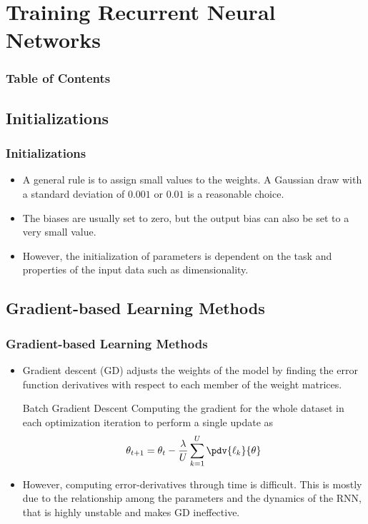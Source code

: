 \documentclass[11pt,]{beamer}
\begin{document}
\section{Training Recurrent Neural Networks}
\begin{frame}
	\frametitle{Table of Contents}
	\tableofcontents[currentsection]
\end{frame}

\subsection{Initializations}

\begin{frame}
	\frametitle{Initializations}

	\begin{itemize}
		\item A general rule is to assign small values to the weights. A
		Gaussian draw with a standard deviation of $0.001$ or $0.01$ is a reasonable choice.
		\bigskip
		\item The biases are usually set to zero,
		but the output bias can also be set to a very small value.
		\bigskip
		\item However, the initialization of parameters is dependent on the
		task and properties of the input data such as dimensionality. 
	\end{itemize}

\end{frame}


\subsection{Gradient-based Learning Methods}

\begin{frame}
	\frametitle{Gradient-based Learning Methods}
	\begin{itemize}
		\item Gradient descent (GD) adjusts the
weights of the model by finding the error function derivatives with respect to each member of the weight matrices.
	
 	\bigskip %
  
        \begin{block}{Batch Gradient Descent}
		Computing the gradient for the whole dataset in each optimization iteration to perform a single update as
		\begin{equation*}
            \theta_{t+1} = \theta_t - \frac{\lambda}{U}\sum_{k=1}^U \pdv{\ell_k}{\theta}
		\end{equation*}
	\end{block}
	
 	\bigskip %

	 \item However, computing error-derivatives through time is difficult. This is mostly due to the
	 relationship among the parameters and the dynamics of the RNN, that is highly unstable and makes GD ineffective.
	\end{itemize}
\end{frame}
\end{document}
